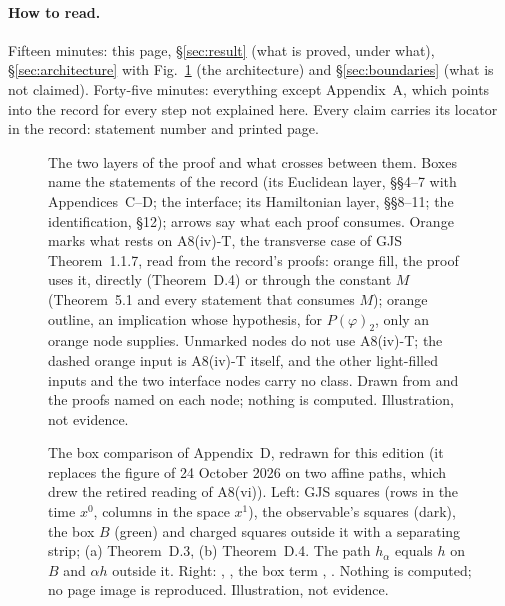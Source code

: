 \documentclass[11pt,a4paper]{article}
\begin{document}
\kern-14pt
\paragraph*{How to read.}
Fifteen minutes: this page, \S\ref{sec:result} (what is proved, under what),
\S\ref{sec:architecture} with Fig.~\ref{fig:spine} (the architecture) and
\S\ref{sec:boundaries} (what is not claimed). Forty-five minutes: everything except
Appendix~A, which points into the record for every step not explained here. Every claim
carries its locator in the record: statement number and printed page.




\begin{figure}[htbp]
\centering

\caption{The two layers of the proof and what crosses between them. Boxes name the
statements of the record (its Euclidean layer, \S\S4--7 with Appendices~C--D; the
interface; its Hamiltonian layer, \S\S8--11; the identification, \S12); arrows say what
each proof consumes. Orange marks what rests on A8(iv)-T, the transverse case of GJS
Theorem~1.1.7, read from the record's proofs: orange fill, the proof uses it, directly
(Theorem~D.4) or through the constant $M$ (Theorem~5.1 and every statement that consumes
$M$); orange outline, an implication whose hypothesis, for $P(\varphi)_2$, only an orange
node supplies. Unmarked nodes do not use A8(iv)-T; the dashed orange input is A8(iv)-T
itself, and the other light-filled inputs and the two interface nodes carry no class. Drawn from  and the proofs named on each
node; nothing is computed. Illustration, not evidence.}
\label{fig:spine}
\end{figure}



\begin{figure}[htbp]
\centering

\caption{The box comparison of Appendix~D, redrawn for this edition (it replaces the figure
of 24 October 2026 on two affine paths, which drew the retired reading of A8(vi)). Left: GJS
squares (rows in the time $x^0$, columns in the space $x^1$), the observable's squares
(dark), the box $B$ (green) and charged squares outside it with a separating strip; (a)
Theorem~D.3, (b) Theorem~D.4. The path $h_\alpha$ equals $h$ on $B$ and $\alpha h$ outside
it. Right: , , the box term ,
. Nothing is computed; no page image is reproduced. Illustration, not
evidence.}
\label{fig:quantifier}
\end{figure}
\end{document}
